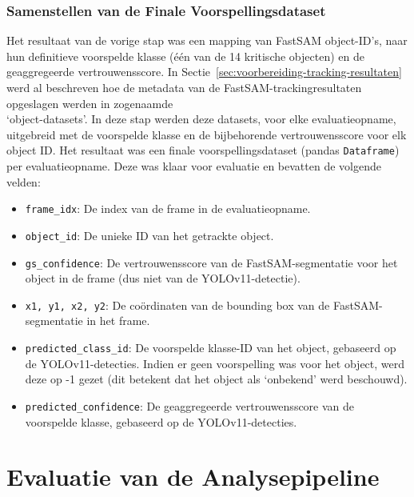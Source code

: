 \subsubsection{Samenstellen van de Finale Voorspellingsdataset}
Het resultaat van de vorige stap was een mapping van FastSAM object-ID's, 
naar hun definitieve voorspelde klasse (één van de 14 kritische objecten) 
en de geaggregeerde vertrouwensscore.
In Sectie~\ref{sec:voorbereiding-tracking-resultaten} werd al beschreven hoe de metadata van de FastSAM-trackingresultaten opgeslagen werden in zogenaamde\\ `object-datasets'.
In deze stap werden deze datasets, voor elke evaluatieopname, uitgebreid met de voorspelde klasse en de bijbehorende vertrouwensscore voor elk object ID.
Het resultaat was een finale voorspellingsdataset (pandas \texttt{Dataframe}) per evaluatieopname. Deze was klaar voor evaluatie en bevatten de volgende velden:
\begin{itemize}
    \item \texttt{frame\_idx}: De index van de frame in de evaluatieopname.
    \item \texttt{object\_id}: De unieke ID van het getrackte object.
    \item \texttt{gs\_confidence}: De vertrouwensscore van de FastSAM-segmentatie voor het object in de frame (dus niet van de YOLOv11-detectie).
    \item \texttt{x1, y1, x2, y2}: De coördinaten van de bounding box van de FastSAM-segmentatie in het frame.
    \item \texttt{predicted\_class\_id}: De voorspelde klasse-ID van het object, gebaseerd op de YOLOv11-detecties.
    Indien er geen voorspelling was voor het object, werd deze op -1 gezet (dit betekent dat het object als `onbekend' werd beschouwd).
    \item \texttt{predicted\_confidence}: De geaggregeerde vertrouwensscore van de voorspelde klasse, gebaseerd op de YOLOv11-detecties.
\end{itemize}

\section{Evaluatie van de Analysepipeline}

